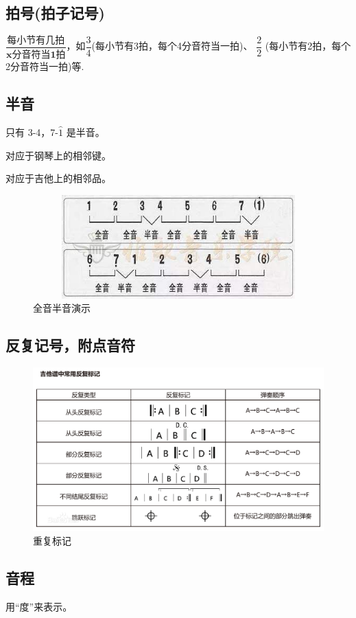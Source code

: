 \documentclass[UTF8,a4paper,12pt]{ctexbook}
\begin{document}
		\subsection*{拍号(拍子记号)}
			$\dfrac{\textbf{每小节有几拍}}{\textbf{x分音符当1拍}} $，如$\dfrac{3}{4} $(每小节有3拍，每个4分音符当一拍)、  $\dfrac{2}{2} $ (每小节有2拍，每个2分音符当一拍)等.
			
		\subsection{半音}
			只有 3-4，7-$\hat{1}$ 是半音。
			
			对应于钢琴上的相邻键。
			
			对应于吉他上的相邻品。
			
			\begin{figure}[H]
				\centering
				\includegraphics[width=12cm,height=4cm]{timg.jpg}
				\caption{全音半音演示}
			\end{figure}
			
		\subsection{反复记号，附点音符}
			\begin{figure}[H]
				\centering
				\includegraphics[scale=0.34]{repeat}
				\caption{重复标记}
			\end{figure}
		\subsection{音程}
			用“度”来表示。
\end{document}
